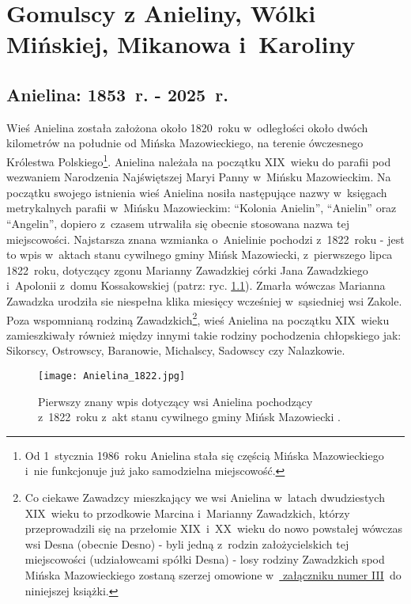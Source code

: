 \chapter{Gomulscy z Anieliny, Wólki Mińskiej, Mikanowa i~Karoliny}



\section{Anielina: 1853~r. - 2025~r.}

Wieś Anielina została założona około 1820~roku w~odległości około dwóch 
kilometrów na południe od Mińska Mazowieckiego, na terenie ówczesnego 
Królestwa Polskiego\footnote{Od 1~stycznia 1986~roku Anielina stała się 
częścią Mińska Mazowieckiego i~nie funkcjonuje już jako samodzielna 
miejscowość.}. Anielina należała na początku XIX~wieku do parafii pod 
wezwaniem Narodzenia Najświętszej Maryi Panny w~Mińsku Mazowieckim. Na 
początku swojego istnienia wieś Anielina nosiła następujące nazwy w~księgach 
metrykalnych parafii w~Mińsku Mazowieckim: \enquote{Kolonia Anielin}, 
\enquote{Anielin} oraz \enquote{Angelin}, dopiero z~czasem utrwaliła się 
obecnie stosowana nazwa tej miejscowości. Najstarsza znana wzmianka 
o~Anielinie pochodzi z~1822~roku - jest to wpis w~aktach stanu cywilnego 
gminy Mińsk Mazowiecki, z~pierwszego lipca 1822~roku, dotyczący zgonu 
Marianny Zawadzkiej córki Jana Zawadzkiego i~Apolonii z~domu Kossakowskiej 
(patrz: ryc. \ref{fig:anielina_1822}). Zmarła wówczas Marianna Zawadzka 
urodziła sie niespełna klika miesięcy wcześniej w~sąsiedniej wsi Zakole. Poza 
wspomnianą rodziną Zawadzkich\footnote{Co ciekawe Zawadzcy mieszkający we wsi 
Anielina w~latach dwudziestych XIX~wieku to przodkowie Marcina i~Marianny 
Zawadzkich, którzy przeprowadzili się na przełomie XIX~i~XX~wieku do nowo 
powstałej wówczas wsi Desna (obecnie Desno) - byli jedną z~rodzin
założycielskich tej miejscowości (udziałowcami spółki Desna) - losy rodziny
Zawadzkich spod Mińska Mazowieckiego zostaną szerzej omowione
w~\hyperref[sec:zawadzcy]{ załączniku numer III}~do niniejszej książki.},
wieś Anielina na początku XIX~wieku zamieszkiwały również między innymi takie
rodziny pochodzenia chłopskiego jak: Sikorscy, Ostrowscy, Baranowie, Michalscy,
Sadowscy czy Nalazkowie.

\begin{figure}[!ht]
    \vspace*{0.5cm}
    \centering \texttt{[image: 
        Anielina\_1822.jpg]}
    \captionsetup{format=hang}
    \caption{Pierwszy znany wpis dotyczący wsi Anielina pochodzący 
    z~1822~roku z~akt stanu cywilnego gminy Mińsk Mazowiecki 
    \cite{par_minsk1}.}
    \label{fig:anielina_1822}
\end{figure}

